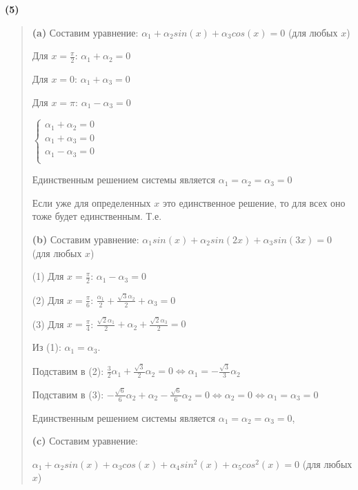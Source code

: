 \documentclass{article}
\begin{document}
\textbf{\textsf{(5)}}
\begin{quote}
    \textbf{(a)} Составим уравнение:
    $\alpha_1 + \alpha_2 sin(x) + \alpha_3 cos(x) = 0$ (для любых $x$)

    Для $x = \frac{\pi}{2}$: $\alpha_1 + \alpha_2 = 0$
    
    Для $x = 0$: $\alpha_1 + \alpha_3 = 0$ 
    
    Для $x = \pi$: $\alpha_1 - \alpha_3 = 0$

    $\begin{cases}
        \alpha_1 + \alpha_2 = 0 \\
        \alpha_1 + \alpha_3 = 0 \\
        \alpha_1 - \alpha_3 = 0 \\
    \end{cases}$
    
    Единственным решением системы является $\alpha_1 = \alpha_2 = \alpha_3 = 0$
    
    Если уже для определенных $x$ это единственное решение, то для всех оно тоже будет единственным.
    Т.е. 

    
    \textbf{(b)} Составим уравнение:
    $\alpha_1 sin(x) + \alpha_2 sin(2x) + \alpha_3 sin(3x) = 0$ (для любых $x$)
    
    (1) Для $x = \frac{\pi}{2}$: $\alpha_1 - \alpha_3 = 0$
    
    (2) Для $x = \frac{\pi}{6}$: $\frac{\alpha_1}{2} + \frac{\sqrt{3}\alpha_2}{2} + \alpha_3 = 0$
    
    (3) Для $x = \frac{\pi}{4}$: $\frac{\sqrt{2}\alpha_1}{2} + \alpha_2 + \frac{\sqrt{2}\alpha_3}{2}  = 0$

    Из (1): $\alpha_1 = \alpha_3$. 
    
    Подставим в (2): $\frac{3}{2}\alpha_1 + \frac{\sqrt{3}}{2}\alpha_2 = 0 \Leftrightarrow 
    \alpha_1 = -\frac{\sqrt{3}}{3} \alpha_2$

   Подставим в (3): $-\frac{\sqrt{6}}{6}\alpha_2 + \alpha_2 -\frac{\sqrt{6}}{6}\alpha_2 = 0 \Leftrightarrow \alpha_2 = 0 \Leftrightarrow \alpha_1 = \alpha_3 = 0$
   
   Единственным решением системы является $\alpha_1 = \alpha_2 = \alpha_3 = 0$, 

    \textbf{(c)} Составим уравнение:
    
    $\alpha_1+ \alpha_2 sin(x) + \alpha_3 cos(x) + \alpha_4 sin^2(x) + \alpha_5 cos^2(x) = 0$ (для любых $x$)


\end{quote}
\end{document}
